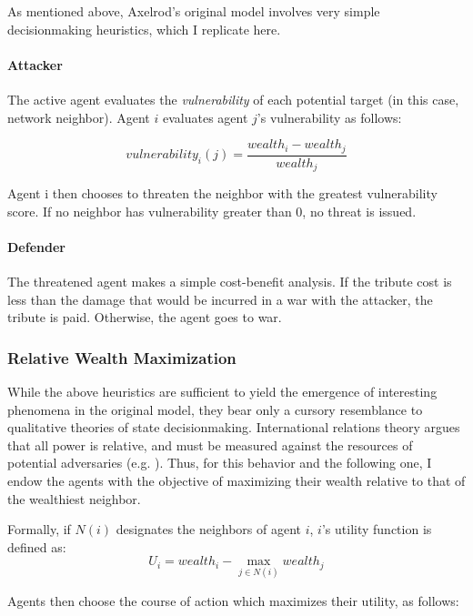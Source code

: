 \documentclass{article}
\begin{document}
As mentioned above, Axelrod's original model involves very simple decisionmaking heuristics, which I replicate here. 

\paragraph{Attacker}
The active agent evaluates the \emph{vulnerability} of each potential target (in this case, network neighbor). Agent $i$ evaluates agent $j$'s vulnerability as follows:

\begin{equation}
vulnerability_{i}(j)=\frac{wealth_i - wealth_j}{wealth_j}
\end{equation}

Agent i then chooses to threaten the neighbor with the greatest vulnerability score. If no neighbor has vulnerability greater than 0, no threat is issued.

\paragraph{Defender}
The threatened agent makes a simple cost-benefit analysis. If the tribute cost is less than the damage that would be incurred in a war with the attacker, the tribute is paid. Otherwise, the agent goes to war. 

\subsubsection{Relative Wealth Maximization}

While the above heuristics are sufficient to yield the emergence of interesting phenomena in the original model, they bear only a cursory resemblance to qualitative theories of state decisionmaking. International relations theory argues that all power is relative, and must be measured against the resources of potential adversaries (e.g. \citet{waltz_2010}). Thus, for this behavior and the following one, I endow the agents with the objective of maximizing their wealth relative to that of the wealthiest neighbor. 

Formally, if $N(i)$ designates the neighbors of agent $i$, $i$'s utility function is defined as:
\begin{equation}
U_i=wealth_i-\operatorname*{max}_{j\in N(i)}wealth_j
\end{equation}

Agents then choose the course of action which maximizes their utility, as follows:
\end{document}
